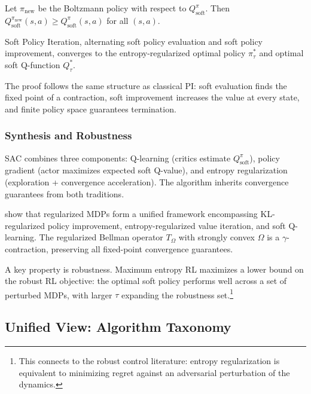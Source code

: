 \begin{lemma}
\label{lem:soft_improve}
Let $\pi_{\text{new}}$ be the Boltzmann policy with respect to $Q^\pi_{\text{soft}}$. Then $Q^{\pi_{\text{new}}}_{\text{soft}}(s,a) \geq Q^\pi_{\text{soft}}(s,a)$ for all $(s,a)$.
\end{lemma}

\begin{theorem}
\label{thm:soft_pi}
Soft Policy Iteration, alternating soft policy evaluation and soft policy improvement, converges to the entropy-regularized optimal policy $\pi^*_\tau$ and optimal soft Q-function $Q^*_\tau$.
\end{theorem}

The proof follows the same structure as classical PI: soft evaluation finds the fixed point of a contraction, soft improvement increases the value at every state, and finite policy space guarantees termination.


\subsubsection{Synthesis and Robustness}

SAC combines three components: Q-learning (critics estimate $Q^\pi_{\text{soft}}$), policy gradient (actor maximizes expected soft Q-value), and entropy regularization (exploration + convergence acceleration). The algorithm inherits convergence guarantees from both traditions.

\citet{geist2019regularized} show that regularized MDPs form a unified framework encompassing KL-regularized policy improvement, entropy-regularized value iteration, and soft Q-learning. The regularized Bellman operator $T_\Omega$ with strongly convex $\Omega$ is a $\gamma$-contraction, preserving all fixed-point convergence guarantees.

A key property is robustness. Maximum entropy RL maximizes a lower bound on the robust RL objective: the optimal soft policy performs well across a set of perturbed MDPs, with larger $\tau$ expanding the robustness set.\footnote{This connects to the robust control literature: entropy regularization is equivalent to minimizing regret against an adversarial perturbation of the dynamics.}


\subsection{Unified View: Algorithm Taxonomy}
\label{sec:taxonomy}

